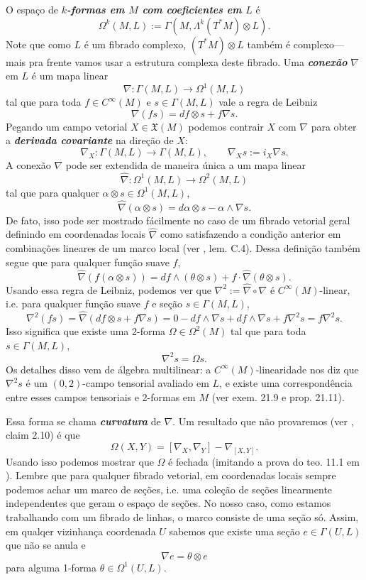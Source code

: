 O espaço de \textit{\textbf{$k$-formas em $M$ com coeficientes em $L$}} é
	\[\Omega^{k}(M,L):=\Gamma(M,\Lambda^{k}(T^*M)\otimes L).\]
Note que como $L$ é um fibrado complexo, $(T^*M)\otimes L$ também é complexo---mais pra frente vamos usar a estrutura complexa deste fibrado. Uma \textit{\textbf{conexão}} $\nabla$ em $L$ é um mapa linear
\[\nabla:\Gamma(M,L)\to\Omega^{1}(M,L)\]
tal que para toda $f\in C^\infty(M)$ e $s \in \Gamma(M,L)$ vale a regra de Leibniz
\[\nabla(fs)=df\otimes s+f\nabla s.\]
Pegando um campo vetorial $X \in \mathfrak{X}(M)$ podemos contrair $X$ com $\nabla$ para obter a \textit{\textbf{derivada covariante}} na direção de $X$:
\[\nabla_X:\Gamma(M,L)\to \Gamma(M,L), \qquad \nabla_Xs:=i_X\nabla s.\]
A conexão $\nabla$ pode ser extendida de maneira única a um mapa linear
\[\widehat{\nabla}:\Omega^{1}(M,L)\longrightarrow \Omega^{2}(M,L)\]
tal que para qualquer $\alpha \otimes s \in\Omega^{1}(M,L)$,
\[\widehat{\nabla}(\alpha \otimes s)=d\alpha \otimes s -\alpha\wedge\nabla s.\]
De fato, isso pode ser mostrado fácilmente no caso de um fibrado vetorial geral definindo em coordenadas locais $\widehat{\nabla}$ como satisfazendo a condição anterior em combinações lineares de um marco local (ver \cite{milnorch}, lem. C.4). Dessa definição também segue que para qualquer função suave $f$,
\[\widehat{\nabla}(f(\alpha \otimes s))=df \wedge (\theta \otimes s)+f \cdot\widehat{\nabla}(\theta \otimes s).\]
Usando essa regra de Leibniz, podemos ver que $\nabla^2:=\widehat{\nabla}\circ\nabla$ é $C^\infty(M)$-linear, i.e. para qualquer função suave $f$ e seção $s \in \Gamma(M,L)$,
\[\nabla^2(fs)=\widehat{\nabla}(df \otimes s+f\nabla s)=0-df \wedge \nabla s+df \wedge \nabla s+f \nabla^2s=f\nabla^2 s.\]
Isso significa que existe uma 2-forma $\Omega\in\Omega^{2}(M)$ tal que para toda $s \in \Gamma(M,L)$,
\[\nabla^2s=\Omega s.\]
Os detalhes disso vem de álgebra multilinear: a $C^\infty(M)$-linearidade nos diz que $\nabla^2s$ é um $(0,2)$-campo tensorial avaliado em  $L$, e existe uma correspondência entre esses campos tensoriais e 2-formas em $M$ (ver \cite{tu-diff} exem. 21.9 e prop. 21.11).

Essa forma se chama \textit{\textbf{curvatura}} de $\nabla$. Um resultado que não provaremos (ver  \cite{verbi}, claim 2.10) é que
\[\Omega(X,Y)=[\nabla_X,\nabla_Y]-\nabla_{[X,Y]}.\]
Usando isso podemos mostrar que $\Omega$ é fechada (imitando a prova do teo. 11.1 em  \cite{tu-diff}). Lembre que para qualquer fibrado vetorial, em coordenadas locais sempre podemos achar um marco de seções, i.e. uma coleção de seções linearmente independentes que geram o espaço de seções. No nosso caso, como estamos trabalhando com um fibrado de linhas, o marco consiste de uma seção só. Assim, em qualqer vizinhança coordenada $U$ sabemos que existe uma seção $e \in \Gamma(U,L)$ que não se anula e
\[\nabla e=\theta \otimes e\]
para alguma 1-forma $\theta \in \Omega^{1}(U,L)$.

